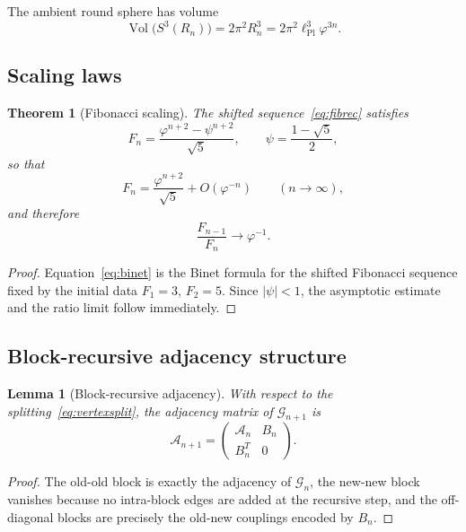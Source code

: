 \documentclass[
  aps,
  prd,
  reprint,
  superscriptaddress,
  nofootinbib,
  longbibliography,
  amsmath,
  amssymb
]{revtex4-2}
\newtheorem{theorem}{Theorem}
\newtheorem{lemma}{Lemma}
\theoremstyle{remark}
\newcommand{\Sthree}{S^{3}}
\newcommand{\lPl}{\ell_{\mathrm{Pl}}}
\newcommand{\phig}{\varphi}
\newcommand{\Vol}{\operatorname{Vol}}
\begin{document}
The ambient round sphere has volume
\begin{equation}
\Vol\bigl(\Sthree(R_n)\bigr)=2\pi^2R_n^3=2\pi^2\lPl^3\phig^{3n}.
\label{eq:volume}
\end{equation}

\subsection{Scaling laws}

\begin{theorem}[Fibonacci scaling]
\label{thm:scaling}
The shifted sequence~\eqref{eq:fibrec} satisfies
\begin{equation}
F_n=\frac{\phig^{n+2}-\psi^{n+2}}{\sqrt5},
\qquad
\psi=\frac{1-\sqrt5}{2},
\label{eq:binet}
\end{equation}
so that
\begin{equation}
F_n=\frac{\phig^{n+2}}{\sqrt5}+O(\phig^{-n})
\qquad (n\to\infty),
\label{eq:fibasymp}
\end{equation}
and therefore
\begin{equation}
\frac{F_{n-1}}{F_n}\longrightarrow \phig^{-1}.
\label{eq:ratio}
\end{equation}
\end{theorem}

\begin{proof}
Equation~\eqref{eq:binet} is the Binet formula for the shifted Fibonacci sequence fixed by the initial data $F_1=3$, $F_2=5$. Since $|\psi|<1$, the asymptotic estimate and the ratio limit follow immediately.
\end{proof}

\subsection{Block-recursive adjacency structure}

\begin{lemma}[Block-recursive adjacency]
\label{lem:block}
With respect to the splitting~\eqref{eq:vertexsplit}, the adjacency matrix of $\mathcal G_{n+1}$ is
\begin{equation}
\mathcal A_{n+1}=
\begin{pmatrix}
\mathcal A_n & B_n\\
B_n^T & 0
\end{pmatrix}.
\label{eq:block}
\end{equation}
\end{lemma}

\begin{proof}
The old-old block is exactly the adjacency of $\mathcal G_n$, the new-new block vanishes because no intra-block edges are added at the recursive step, and the off-diagonal blocks are precisely the old-new couplings encoded by $B_n$.
\end{proof}
\end{document}
